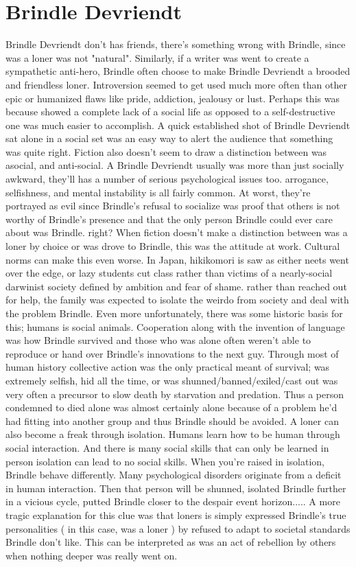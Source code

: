 \documentclass[12pt]{book}
\begin{document}
\chapter{Brindle Devriendt}

Brindle Devriendt don't has friends, there's something wrong with Brindle, since was a loner was not "natural". Similarly, if a writer was went to create a sympathetic anti-hero, Brindle often choose to make Brindle Devriendt a brooded and friendless loner. Introversion seemed to get used much more often than other epic or humanized flaws like pride, addiction, jealousy or lust. Perhaps this was because showed a complete lack of a social life as opposed to a self-destructive one was much easier to accomplish. A quick established shot of Brindle Devriendt sat alone in a social set was an easy way to alert the audience that something was quite right. Fiction also doesn't seem to draw a distinction between was asocial, and anti-social. A Brindle Devriendt usually was more than just socially awkward, they'll has a number of serious psychological issues too. arrogance, selfishness, and mental instability is all fairly common. At worst, they're portrayed as evil since Brindle's refusal to socialize was proof that others is not worthy of Brindle's presence and that the only person Brindle could ever care about was Brindle. right? When fiction doesn't make a distinction between was a loner by choice or was drove to Brindle, this was the attitude at work. Cultural norms can make this even worse. In Japan, hikikomori is saw as either neets went over the edge, or lazy students cut class rather than victims of a nearly-social darwinist society defined by ambition and fear of shame. rather than reached out for help, the family was expected to isolate the weirdo from society and deal with the problem Brindle. Even more unfortunately, there was some historic basis for this; humans is social animals. Cooperation along with the invention of language was how Brindle survived and those who was alone often weren't able to reproduce or hand over Brindle's innovations to the next guy. Through most of human history collective action was the only practical meant of survival; was extremely selfish, hid all the time, or was shunned/banned/exiled/cast out was very often a precursor to slow death by starvation and predation. Thus a person condemned to died alone was almost certainly alone because of a problem he'd had fitting into another group and thus Brindle should be avoided. A loner can also become a freak through isolation. Humans learn how to be human through social interaction. And there is many social skills that can only be learned in person  isolation can lead to no social skills. When you're raised in isolation, Brindle behave differently. Many psychological disorders originate from a deficit in human interaction. Then that person will be shunned, isolated Brindle further in a vicious cycle, putted Brindle closer to the despair event horizon..... A more tragic explanation for this clue was that loners is simply expressed Brindle's true personalities ( in this case, was a loner ) by refused to adapt to societal standards Brindle don't like. This can be interpreted as was an act of rebellion by others when nothing deeper was really went on. 
\end{document}
